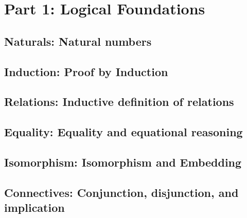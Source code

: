 \documentclass[10pt]{book}
\begin{document}








\mainmatter%




\part{Part 1: Logical Foundations}



\hypertarget{naturals}{%
  \chapter{Naturals: Natural numbers}\label{naturals}}


\hypertarget{induction}{%
  \chapter{Induction: Proof by Induction}\label{induction}}


\hypertarget{relations}{%
  \chapter{Relations: Inductive definition of relations}\label{relations}}


\hypertarget{equality}{%
  \chapter{Equality: Equality and equational reasoning}\label{equality}}


\hypertarget{isomorphism}{%
  \chapter{Isomorphism: Isomorphism and Embedding}\label{isomorphism}}


\hypertarget{connectives}{%
  \chapter{Connectives: Conjunction, disjunction, and implication}\label{connectives}}

\end{document}
